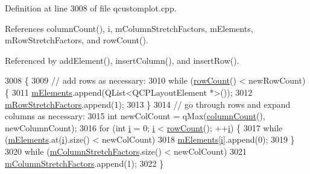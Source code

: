 Definition at line 3008 of file qcustomplot.\+cpp.



References column\+Count(), i, m\+Column\+Stretch\+Factors, m\+Elements, m\+Row\+Stretch\+Factors, and row\+Count().



Referenced by add\+Element(), insert\+Column(), and insert\+Row().


\begin{DoxyCode}
3008                                                                 \{
3009   \textcolor{comment}{// add rows as necessary:}
3010   \textcolor{keywordflow}{while} (\hyperlink{class_q_c_p_layout_grid_af8e6c7a05864ebe610c87756c7b9079c}{rowCount}() < newRowCount) \{
3011     \hyperlink{class_q_c_p_layout_grid_a2ec4664bcfb5d479255e50f0c074f7c9}{mElements}.append(QList<QCPLayoutElement *>());
3012     \hyperlink{class_q_c_p_layout_grid_a36c85a7eaf342680fb9b8a4977486f16}{mRowStretchFactors}.append(1);
3013   \}
3014   \textcolor{comment}{// go through rows and expand columns as necessary:}
3015   \textcolor{keywordtype}{int} newColCount = qMax(\hyperlink{class_q_c_p_layout_grid_ac39074eafd148b82d0762090f258189e}{columnCount}(), newColumnCount);
3016   \textcolor{keywordflow}{for} (\textcolor{keywordtype}{int} \hyperlink{_comparision_pictures_2_createtest_image_8m_a6f6ccfcf58b31cb6412107d9d5281426}{i} = 0; \hyperlink{_comparision_pictures_2_createtest_image_8m_a6f6ccfcf58b31cb6412107d9d5281426}{i} < \hyperlink{class_q_c_p_layout_grid_af8e6c7a05864ebe610c87756c7b9079c}{rowCount}(); ++\hyperlink{_comparision_pictures_2_createtest_image_8m_a6f6ccfcf58b31cb6412107d9d5281426}{i}) \{
3017     \textcolor{keywordflow}{while} (\hyperlink{class_q_c_p_layout_grid_a2ec4664bcfb5d479255e50f0c074f7c9}{mElements}.at(\hyperlink{_comparision_pictures_2_createtest_image_8m_a6f6ccfcf58b31cb6412107d9d5281426}{i}).size() < newColCount)
3018       \hyperlink{class_q_c_p_layout_grid_a2ec4664bcfb5d479255e50f0c074f7c9}{mElements}[\hyperlink{_comparision_pictures_2_createtest_image_8m_a6f6ccfcf58b31cb6412107d9d5281426}{i}].append(0);
3019   \}
3020   \textcolor{keywordflow}{while} (\hyperlink{class_q_c_p_layout_grid_ac6aabe62339f94f18b9f8adab94b1840}{mColumnStretchFactors}.size() < newColCount)
3021     \hyperlink{class_q_c_p_layout_grid_ac6aabe62339f94f18b9f8adab94b1840}{mColumnStretchFactors}.append(1);
3022 \}
\end{DoxyCode}


